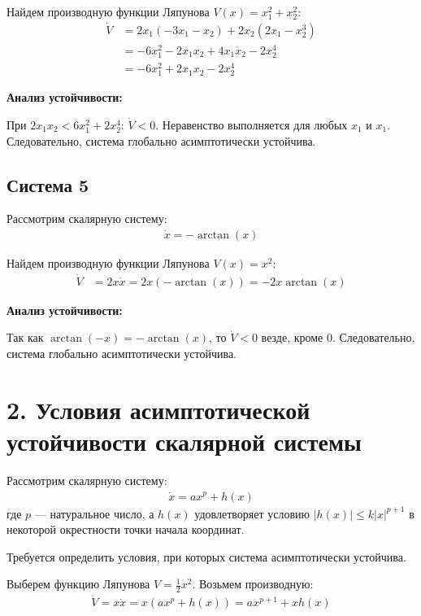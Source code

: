 Найдем производную функции Ляпунова $V(x) = x_1^2 + x_2^2$:
\begin{align*}
\dot{V} &= 2x_1(-3x_1 - x_2) + 2x_2(2x_1 - x_2^3) \\
&= -6x_1^2 - 2x_1 x_2 + 4x_1 x_2 - 2x_2^4 \\
&= -6x_1^2 + 2x_1 x_2 - 2x_2^4
\end{align*}

\textbf{Анализ устойчивости:}

При $2x_1 x_2 < 6x_1^2 + 2x_2^4$: $\dot{V} < 0$.
Неравенство выполняется для любых $x_1$ и $x_1$.
Следовательно, система глобально асимптотически устойчива.

\subsection*{Система 5}

Рассмотрим скалярную систему:
\begin{align*}
\dot{x} = -\arctan(x)
\end{align*}

Найдем производную функции Ляпунова $V(x) = x^2$:
\begin{align*}
\dot{V} &= 2x \dot{x} = 2x(-\arctan(x)) = -2x\arctan(x)
\end{align*}

\textbf{Анализ устойчивости:}

Так как $\arctan(-x) = -\arctan(x)$, то $\dot{V} < 0$ везде, кроме 0. 
Следовательно, система глобально асимптотически устойчива.


\section{2. Условия асимптотической устойчивости скалярной системы}

Рассмотрим скалярную систему:
\begin{align*}
\dot{x} = ax^p + h(x)
\end{align*}
где $p$ — натуральное число, а $h(x)$ удовлетворяет условию $|h(x)| \leq k|x|^{p+1}$ в некоторой окрестности точки начала координат.

Требуется определить условия, при которых система асимптотически устойчива.

Выберем функцию Ляпунова $V=\frac{1}{2}x^2$. Возьмем производную:
\begin{align*}
\dot{V} = x\dot{x} = x(ax^p + h(x)) = ax^{p+1} + xh(x)
\end{align*}

